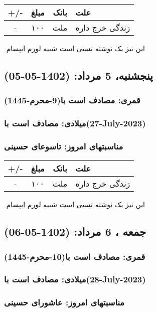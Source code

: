 \documentclass{article}
\newcommand{\rnote}[1]{\marginpar{\textcolor{color}{\StrSubstitute{\##1}{ }{\_}}}}
\newcommand{\myRow}[4]{
    #1 & #2 & #3 & #4 \\ \hline
}
\begin{document}
\begin{tabular}{ | c | c | c | p{5cm} |}
    \hline
    \myRow{ +/- }{مبلغ}{بانک}{علت}
    \myRow{-}{۱۰۰}{ملت}{زندگی خرج داره}
\end{tabular}
\newline
\newline

‌
\rnote{تست}
این نیز یک نوشته تستی است شبیه لورم ایپسام




\newpage
{}
\textcolor{color}{
\section{ پنجشنبه، 5 مرداد: (1402-05-05) }
\subsubsection*{قمری: مصادف است با(9-محرم-1445)} 
\subsubsection*{میلادی: مصادف است با(27-July-2023)}
\subsubsection*{مناسبتهای امروز: تاسوعای حسینی}
}


\begin{tabular}{ | c | c | c | p{5cm} |}
    \hline
    \myRow{ +/- }{مبلغ}{بانک}{علت}
    \myRow{-}{۱۰۰}{ملت}{زندگی خرج داره}
\end{tabular}
\newline
\newline

‌
\rnote{تست}
این نیز یک نوشته تستی است شبیه لورم ایپسام




\newpage
{}
\textcolor{color}{
\section{ جمعه ، 6 مرداد: (1402-05-06) }
\subsubsection*{قمری: مصادف است با(10-محرم-1445)} 
\subsubsection*{میلادی: مصادف است با(28-July-2023)}
\subsubsection*{مناسبتهای امروز: عاشورای حسینی}
}
\end{document}
